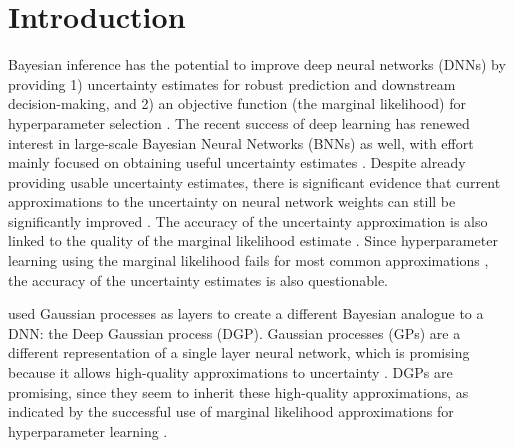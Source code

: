 \chapter{Introduction}  %

Bayesian inference has the potential to improve deep neural networks (DNNs) by providing 1) uncertainty estimates for robust prediction and downstream decision-making, and 2) an objective function (the marginal likelihood) for hyperparameter selection \citep{mackay1992practical,mackay1992bmc,mackay2003information}. The recent success of deep learning \citep{alexnet,attention,Schrittwieser2020MasteringAG} has renewed interest in large-scale Bayesian Neural Networks (BNNs) as well, with effort mainly focused on obtaining useful uncertainty estimates \citep{blundell2015,Kingma2015local,Gal2016dropout}.
Despite already providing usable uncertainty estimates, there is significant evidence that current approximations to the uncertainty on neural network weights can still be significantly improved \citep{hron2017variational,foong2019expressiveness}. The accuracy of the uncertainty approximation is also linked to the quality of the marginal likelihood estimate \citep{blei2017variational}. Since hyperparameter learning using the marginal likelihood fails for most common approximations \citep[e.g.,][]{blundell2015}, the accuracy of the uncertainty estimates is also questionable.


\citet{Damianou2013} used Gaussian processes \citep{rasmussen2006} as layers to create a different Bayesian analogue to a DNN: the Deep Gaussian process (DGP). Gaussian processes (GPs) are a different representation of a single layer neural network, which is promising because it allows high-quality approximations to uncertainty \citep{titsias2009,burt2019}. DGPs are promising, since they seem to inherit these high-quality approximations, as indicated by the successful use of marginal likelihood approximations for hyperparameter learning \citep{Damianou2013,Dutordoir2020convolutional}.

